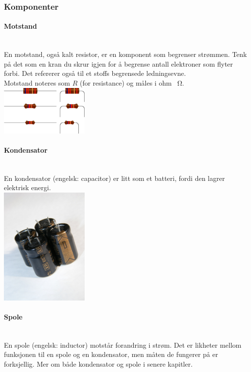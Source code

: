 \subsubsection{Komponenter}
\paragraph{Motstand} \mbox{} \\
En motstand, også kalt resistor, er en komponent som begrenser strømmen.
Tenk på det som en kran du skrur igjen for å begrense antall elektroner som flyter forbi.
Det refererer også til et stoffs begrensede ledningsevne.
\\
Motstand noteres som $R$ (for resistance) og måles i ohm \SI{}{\ohm}.
\\
\includegraphics[width=0.33\textwidth]{./img/resistor}

\paragraph{Kondensator} \mbox{} \\
En kondensator (engelsk: capacitor) er litt som et batteri,
fordi den lagrer elektrisk energi.
\\
\includegraphics[width=0.33\textwidth]{./img/kondensator}

\paragraph{Spole} \mbox{} \\
En spole (engelsk: inductor) motstår forandring i strøm.
Det er likheter mellom funksjonen til en spole og en kondensator, men måten de fungerer på er forksjellig.
Mer om både kondensator og spole i senere kapitler.
